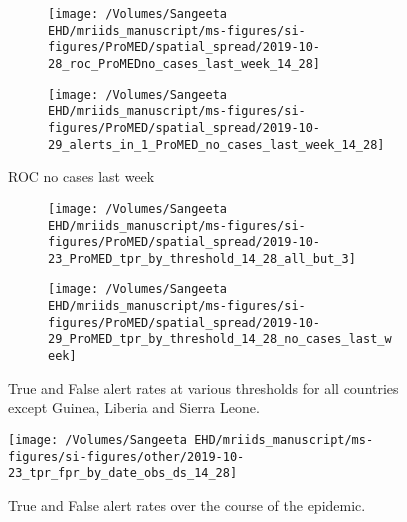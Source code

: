 \documentclass[9pt,twoside,lineno]{pnas-new}
\begin{document}
\begin{figure}
\centering
\begin{subfigure}[b]{0.45\textwidth}
\texttt{[image: /Volumes/Sangeeta EHD/mriids\_manuscript/ms-figures/si-figures/ProMED/spatial\_spread/2019-10-28\_roc\_ProMEDno\_cases\_last\_week\_14\_28]}
\end{subfigure}
\begin{subfigure}[b]{0.45\textwidth}
\texttt{[image: /Volumes/Sangeeta
  EHD/mriids\_manuscript/ms-figures/si-figures/ProMED/spatial\_spread/2019-10-29\_alerts\_in\_1\_ProMED\_no\_cases\_last\_week\_14\_28]}
\end{subfigure}
\caption{ROC no cases last week}
\label{fig:rocnocases}
\end{figure}\FloatBarrier



\begin{figure}
\centering
\begin{subfigure}[b]{0.45\textwidth}
\texttt{[image: /Volumes/Sangeeta EHD/mriids\_manuscript/ms-figures/si-figures/ProMED/spatial\_spread/2019-10-23\_ProMED\_tpr\_by\_threshold\_14\_28\_all\_but\_3]}
\end{subfigure}
\begin{subfigure}[b]{0.45\textwidth}
\texttt{[image: /Volumes/Sangeeta
  EHD/mriids\_manuscript/ms-figures/si-figures/ProMED/spatial\_spread/2019-10-29\_ProMED\_tpr\_by\_threshold\_14\_28\_no\_cases\_last\_week]}
\end{subfigure}
\caption{True and False alert rates at various thresholds for all
  countries except Guinea, Liberia and Sierra Leone.}
\label{fig:tprbythreshold}
\end{figure}\FloatBarrier


\begin{figure}
\centering
\texttt{[image: /Volumes/Sangeeta EHD/mriids\_manuscript/ms-figures/si-figures/other/2019-10-23\_tpr\_fpr\_by\_date\_obs\_ds\_14\_28]}
\caption{True and False alert rates over the course of the epidemic.}
\label{fig:tprovertime}
\end{figure}\FloatBarrier
\end{document}
